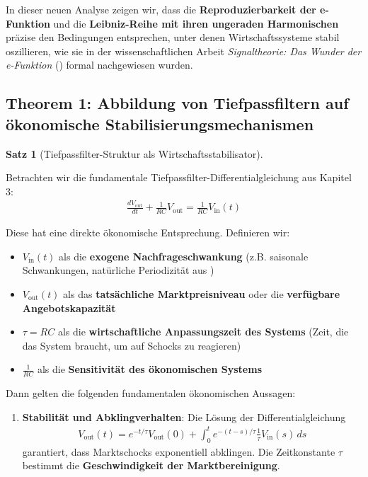 \documentclass[a4paper, 12pt, twoside, openright]{report}
\theoremstyle{definition}
\theoremstyle{definition}
\newtheorem{satz}{Satz}[chapter]
\begin{document}
In dieser neuen Analyse zeigen wir, dass die \textbf{Reproduzierbarkeit der e-Funktion} und die \textbf{Leibniz-Reihe mit ihren ungeraden Harmonischen} präzise den Bedingungen entsprechen, unter denen Wirtschaftssysteme stabil oszillieren, wie sie in der wissenschaftlichen Arbeit \textit{Signaltheorie: Das Wunder der e-Funktion} (\cite{epp_signal}) formal nachgewiesen wurden.

\subsection*{Theorem 1: Abbildung von Tiefpassfiltern auf ökonomische Stabilisierungsmechanismen}

\begin{satz}[Tiefpassfilter-Struktur als Wirtschaftsstabilisator]
\label{satz:tiefpass_oekonomie}

Betrachten wir die fundamentale Tiefpassfilter-Differentialgleichung aus Kapitel 3:
\begin{align}
\frac{dV_{\text{out}}}{dt} + \frac{1}{RC} V_{\text{out}} = \frac{1}{RC} V_{\text{in}}(t)
\end{align}

Diese hat eine direkte ökonomische Entsprechung. Definieren wir:
\begin{itemize}
\item $V_{\text{in}}(t)$ als die \textbf{exogene Nachfrageschwankung} (z.B. saisonale Schwankungen, natürliche Periodizität aus \cite{epp_signal})
\item $V_{\text{out}}(t)$ als das \textbf{tatsächliche Marktpreisniveau} oder die \textbf{verfügbare Angebotskapazität}
\item $\tau = RC$ als die \textbf{wirtschaftliche Anpassungszeit des Systems} (Zeit, die das System braucht, um auf Schocks zu reagieren)
\item $\frac{1}{RC}$ als die \textbf{Sensitivität des ökonomischen Systems}
\end{itemize}

Dann gelten die folgenden fundamentalen ökonomischen Aussagen:

\begin{enumerate}

\item \textbf{Stabilität und Abklingverhalten}: Die Lösung der Differentialgleichung
\begin{align}
V_{\text{out}}(t) = e^{-t/\tau} V_{\text{out}}(0) + \int_0^t e^{-(t-s)/\tau} \frac{1}{\tau} V_{\text{in}}(s) \, ds
\end{align}
garantiert, dass Marktschocks exponentiell abklingen. Die Zeitkonstante $\tau$ bestimmt die \textbf{Geschwindigkeit der Marktbereinigung}.


\end{enumerate}
\end{satz}
\end{document}
